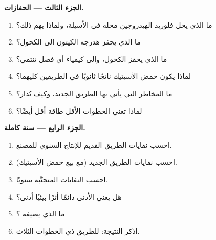 \begin{problem}
\medskip\noindent\textbf{الجزء الثالث --- الحفازات.}
\begin{enumerate}[resume]
  \item ما الذي يحل فلوريد الهيدروجين محله في الأسيلة، ولماذا يهم ذلك؟
  \item ما الذي يحفز هدرجة الكيتون إلى الكحول؟
  \item ما الذي يحفز  الكحول، وإلى كيمياء أي فصل
        تنتمي؟
  \item لماذا يكون حمض الأسيتيك ناتجًا ثانويًا في الطريقين كليهما؟
  \item ما المخاطر التي يأتي بها الطريق الجديد، وكيف تُدار؟
  \item لماذا تعني الخطوات الأقل طاقة أقل أيضًا؟
\end{enumerate}

\medskip\noindent\textbf{الجزء الرابع --- سنة كاملة.}
\begin{enumerate}[resume]
  \item احسب نفايات الطريق القديم للإنتاج السنوي للمصنع.
  \item احسب نفايات الطريق الجديد (مع بيع حمض الأسيتيك).
  \item احسب النفايات المتجنَّبة سنويًا.
  \item هل يعني  الأدنى دائمًا أثرًا بيئيًا أدنى؟
  \item ما الذي يضيفه ؟
  \item اذكر النتيجة:  للطريق ذي الخطوات الثلاث.
\end{enumerate}
\end{problem}
